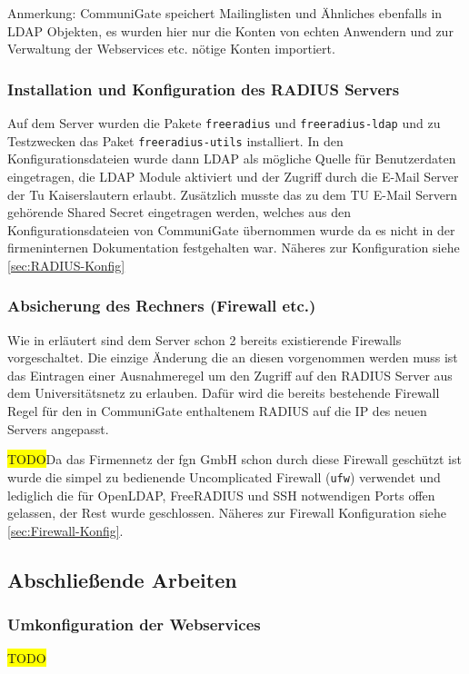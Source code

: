 \documentclass[11pt,a4paper,titlepage=firstiscover]{scrartcl} %
\newcommand{\hilight}[1]{\colorbox{yellow}{#1}} %
\begin{document}
Anmerkung: CommuniGate speichert Mailinglisten und \"Ahnliches ebenfalls in LDAP Objekten, es wurden hier nur die Konten von echten Anwendern und zur Verwaltung der Webservices etc. n\"otige Konten importiert.

\subsubsection{Installation und Konfiguration des RADIUS Servers}\label{sec:RADIUS-Konf}
Auf dem Server wurden die Pakete \texttt{freeradius} und \texttt{freeradius-ldap} und zu Testzwecken das Paket \texttt{freeradius-utils} installiert. In den Konfigurationsdateien wurde dann LDAP als m\"ogliche Quelle f\"ur Benutzerdaten eingetragen, die LDAP Module aktiviert und der Zugriff durch die E-Mail Server der Tu Kaiserslautern erlaubt. Zus\"atzlich musste das zu dem TU E-Mail Servern geh\"orende Shared Secret eingetragen werden, welches aus den Konfigurationsdateien von CommuniGate \"ubernommen wurde da es nicht in der firmeninternen Dokumentation festgehalten war. N\"aheres zur Konfiguration siehe \autoref{sec:RADIUS-Konfig}

\subsubsection{Absicherung des Rechners (Firewall etc.)}
Wie in  erl\"autert sind dem Server schon 2 bereits existierende Firewalls vorgeschaltet. Die einzige \"Anderung die an diesen vorgenommen werden muss ist das Eintragen einer Ausnahmeregel um den Zugriff auf den RADIUS Server aus dem Universit\"atsnetz zu erlauben. Daf\"ur wird die bereits bestehende Firewall Regel f\"ur den in CommuniGate enthaltenem RADIUS auf die IP des neuen Servers angepasst.

\hilight{TODO}Da das Firmennetz der fgn GmbH schon durch diese Firewall gesch\"utzt ist wurde die simpel zu bedienende Uncomplicated Firewall (\texttt{ufw}) verwendet und lediglich die f\"ur OpenLDAP, FreeRADIUS und SSH notwendigen Ports offen gelassen, der Rest wurde geschlossen. N\"aheres zur Firewall Konfiguration siehe \autoref{sec:Firewall-Konfig}.

\subsection{Abschlie\ss{}ende Arbeiten}
\subsubsection{Umkonfiguration der Webservices}
\hilight{TODO}
\end{document}
